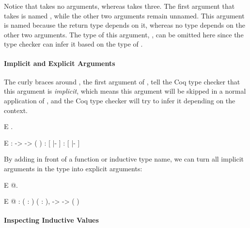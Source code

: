 Notice that \vnil{} takes no arguments, whereas \vcons{} takes three. The first argument that \vcons{} takes is named , while the other two arguments remain unnamed. This argument is named because the return type depends on it, whereas no type depends on the other two arguments. The type of this argument, , can be omitted here since the type checker can infer it based on the type of \vec{}.

\paragraph*{Implicit and Explicit Arguments} The curly braces around , the first argument of \vcons{}, tell the Coq type checker that this argument is \emph{implicit}, which means this argument will be skipped in a normal application of \vcons{}, and the Coq type checker will try to infer it depending on the context.

\vspace{.2in}
\begin{SaveVerbatim}{E}
 .
\end{SaveVerbatim}

\begin{SaveVerbatim}{E}
     :  ->    ->   ( )
 : [ |- ]
 : [ |- ]
\end{SaveVerbatim}

By adding  in front of a function or inductive type name, we can turn all implicit arguments in the type into explicit arguments:

\vspace{.2in}
\begin{SaveVerbatim}{E}
 @.
\end{SaveVerbatim}

\begin{SaveVerbatim}{E}
@
     :  ( : ) ( : ),  ->    ->   ( )
\end{SaveVerbatim}


\paragraph*{Inspecting Inductive Values}

